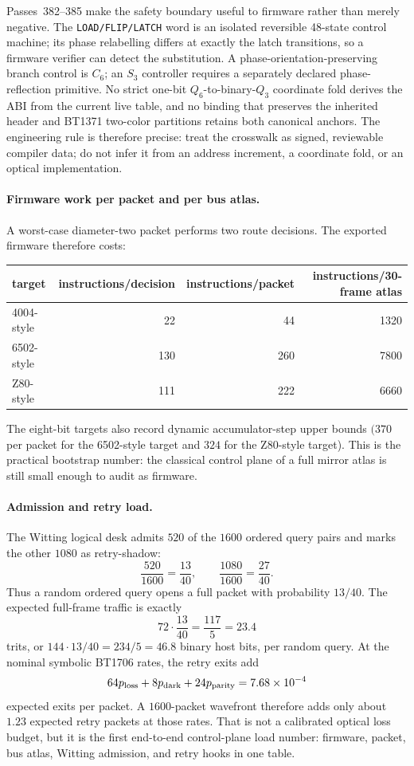 \documentclass[11pt]{article}
\begin{document}
Passes~382--385 make the safety boundary useful to firmware rather than merely
negative.  The \texttt{LOAD/FLIP/LATCH} word is an isolated reversible
48-state control machine; its phase relabelling differs at exactly the latch
transitions, so a firmware verifier can detect the substitution.  A
phase-orientation-preserving branch control is \(C_6\); an \(S_3\) controller
requires a separately declared phase-reflection primitive.  No strict
one-bit \(Q_6\)-to-binary-\(Q_3\) coordinate fold derives the ABI from the
current live table, and no binding that preserves the inherited header and
BT1371 two-color partitions retains both canonical anchors.  The engineering
rule is therefore precise: treat the crosswalk as signed, reviewable compiler
data; do not infer it from an address increment, a coordinate fold, or an
optical implementation.

\paragraph{Firmware work per packet and per bus atlas.}
A worst-case diameter-two packet performs two route decisions.  The exported
firmware therefore costs:
\begin{center}
\begin{tabular}{lrrr}
target & instructions/decision & instructions/packet & instructions/30-frame atlas\\
\hline
4004-style & 22 & 44 & 1320\\
6502-style & 130 & 260 & 7800\\
Z80-style & 111 & 222 & 6660
\end{tabular}
\end{center}
The eight-bit targets also record dynamic accumulator-step upper bounds
\((370\) per packet for the 6502-style target and \(324\) for the Z80-style
target).  This is the practical bootstrap number: the classical control plane
of a full mirror atlas is still small enough to audit as firmware.

\paragraph{Admission and retry load.}
The Witting logical desk admits \(520\) of the \(1600\) ordered query pairs and
marks the other \(1080\) as retry-shadow:
\[
  \frac{520}{1600}=\frac{13}{40}, \qquad
  \frac{1080}{1600}=\frac{27}{40}.
\]
Thus a random ordered query opens a full packet with probability \(13/40\).
The expected full-frame traffic is exactly
\[
  72\cdot \frac{13}{40} = \frac{117}{5}=23.4
\]
trits, or \(144\cdot13/40=234/5=46.8\) binary host bits, per random query.
At the nominal symbolic BT1706 rates, the retry exits add
\[
  64p_{\rm loss}+8p_{\rm dark}+24p_{\rm parity}
  =7.68\times10^{-4}
\]
expected exits per packet.  A \(1600\)-packet wavefront therefore adds only
about \(1.23\) expected retry packets at those rates.  That is not a calibrated
optical loss budget, but it is the first end-to-end control-plane load number:
firmware, packet, bus atlas, Witting admission, and retry hooks in one table.
\end{document}
